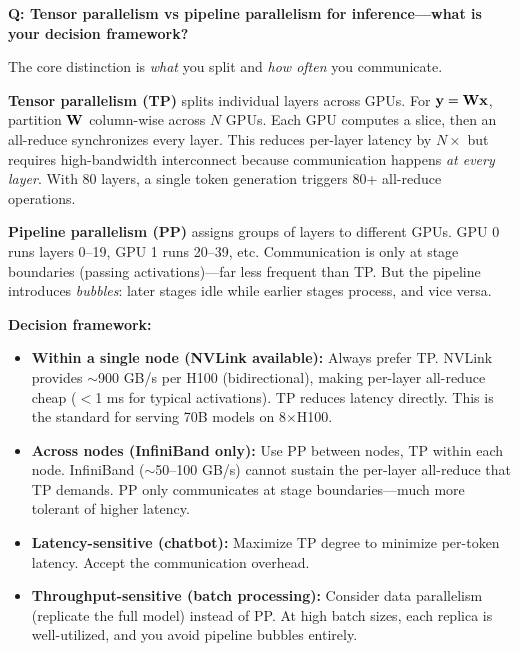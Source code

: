 \begin{interviewq}
\textbf{Q: Tensor parallelism vs pipeline parallelism for inference---what is your decision framework?}

 \quad {} \quad \badgefreq{\freqhigh}

\stronganswer

The core distinction is \textit{what} you split and \textit{how often} you communicate.

\textbf{Tensor parallelism (TP)} splits individual layers across GPUs. For $\mathbf{y} = \mathbf{W}\mathbf{x}$, partition $\mathbf{W}$ column-wise across $N$ GPUs. Each GPU computes a slice, then an all-reduce synchronizes every layer. This reduces per-layer latency by $N\times$ but requires high-bandwidth interconnect because communication happens \textit{at every layer}. With 80 layers, a single token generation triggers 80+ all-reduce operations.

\textbf{Pipeline parallelism (PP)} assigns groups of layers to different GPUs. GPU 0 runs layers 0--19, GPU 1 runs 20--39, etc. Communication is only at stage boundaries (passing activations)---far less frequent than TP. But the pipeline introduces \textit{bubbles}: later stages idle while earlier stages process, and vice versa.

\textbf{Decision framework:}
\begin{itemize}
    \item \textbf{Within a single node (NVLink available):} Always prefer TP. NVLink provides $\sim$900 GB/s per H100 (bidirectional), making per-layer all-reduce cheap ($<$1 ms for typical activations). TP reduces latency directly. This is the standard for serving 70B models on 8$\times$H100.
    \item \textbf{Across nodes (InfiniBand only):} Use PP between nodes, TP within each node. InfiniBand ($\sim$50--100 GB/s) cannot sustain the per-layer all-reduce that TP demands. PP only communicates at stage boundaries---much more tolerant of higher latency.
    \item \textbf{Latency-sensitive (chatbot):} Maximize TP degree to minimize per-token latency. Accept the communication overhead.
    \item \textbf{Throughput-sensitive (batch processing):} Consider data parallelism (replicate the full model) instead of PP. At high batch sizes, each replica is well-utilized, and you avoid pipeline bubbles entirely.
\end{itemize}


\end{interviewq}
